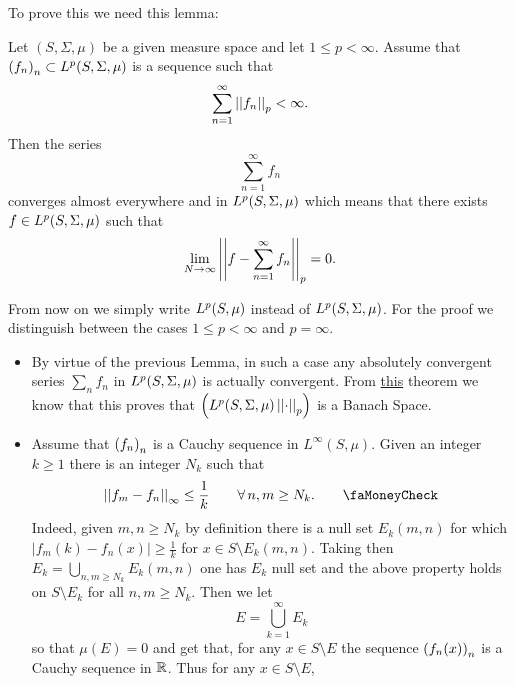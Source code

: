 \documentclass{article}
\begin{document}
\begin{fancyproof}
	To prove this we need this lemma:
	\begin{lemma}
		Let $(S,\Sigma,\mu)$ be a given measure space and let $1\leq p<\infty$. Assume that ${\left({f}_{n}\right)}_{n}\subset L^{p}(S,\Sigma,\mu)$ is a sequence such that
		\begin{equation*}
			\sum_{n=1}^{\infty}\left|\left|f_{n}\right|\right|_{p}<\infty.
		\end{equation*}
		Then the series 
		\begin{equation*}
			\sum_{n=1}^{\infty}f_{n}
		\end{equation*}
		converges almost everywhere and in $L^{p}(S,\Sigma,\mu)$ which means that there exists $f\in L^{p}(S,\Sigma,\mu)$ such that
		\begin{equation*}
			\lim_{N\to\infty}\left|\left|f-\sum_{n=1}^{\infty}f_{n}\right|\right|_{p}=0.
		\end{equation*}
	\end{lemma}
	From now on we simply write $L^{p}(S,\mu)$ instead of $L^{p}(S,\Sigma,\mu)$. For the proof we distinguish between the cases $1\leq p<\infty$ and $p=\infty$.
	\begin{itemize}
		\item By virtue of the previous Lemma, in such a case any absolutely convergent series $\sum_{n}f_{n}$ in $L^{p}(S,\Sigma,\mu)$ is actually convergent. From \hyperref[theo213]{this} theorem we know that this proves that $\left(L^{p}(S,\Sigma,\mu)\left|\left|\cdot\right|\right|_{p}\right)$ is a Banach Space.
		\item Assume that ${\left({f}_{n}\right)}_{n}$ is a Cauchy sequence in $L^{\infty}(S,\mu)$. Given an integer $k\geq 1$ there is an integer $N_{k}$ such that
		\begin{equation*}
			\norm{f_{m}-f_{n}}_{\infty}\leq\frac{1}{k}\qquad\every n,m\geq N_{k}.\tag*{\faMoneyCheck}\label{novabs}
		\end{equation*}
		Indeed, given $m,n\geq N_{k}$ by definition there is a null set $E_{k}(m,n)$ for which $\left|f_{m}(k)-f_{n}(x)\right|\geq\frac{1}{k}$ for $x\in S\setminus E_{k}(m,n)$. Taking then $E_{k}=\bigcup_{n,m\geq N_{k}}E_{k}(m,n)$ one has $E_{k}$ null set and the above property holds on $S\setminus E_{k}$ for all $n,m\geq N_{k}$. Then we let 
		\begin{equation*}
			E=\bigcup_{k=1}^{\infty}E_{k}
		\end{equation*}
		so that $\mu(E)=0$ and get that, for any $x\in S\setminus E$ the sequence ${\left(f_{n}(x)\right)}_{n}$ is a Cauchy sequence in $\mathbb{R}$. Thus for any $x\in S\setminus E$, 
		\begin{equation*}

\end{equation*}
\end{itemize}
\end{fancyproof}
\end{document}
